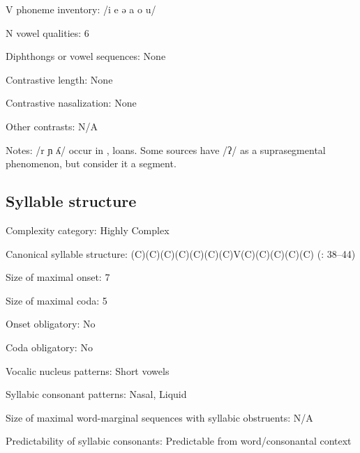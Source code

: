 {\begin{appendixdesc}
\item[V phoneme inventory:] /i e ə a o u/

\item[N vowel qualities:] 6

\item[Diphthongs or vowel sequences:] None

\item[Contrastive length:] None

\item[Contrastive nasalization:] None

\item[Other contrasts:] N/A

\item[Notes:] /r ɲ ʎ/ occur in ,  loans. Some sources have /ʔ/ as a suprasegmental phenomenon, but \citet{GeorgVolodin1999} consider it a segment. 
\end{appendixdesc}
\subsection*{Syllable structure}
\begin{appendixdesc}

\item[Complexity category:] Highly Complex

\item[Canonical syllable structure:] (C)(C)(C)(C)(C)(C)(C)V(C)(C)(C)(C)(C) (\citealt{GeorgVolodin1999}: 38--44)

\item[Size of maximal onset:] 7

\item[Size of maximal coda:] 5

\item[Onset obligatory:] No

\item[Coda obligatory:] No

\item[Vocalic nucleus patterns:] Short vowels

\item[Syllabic consonant patterns:] Nasal, Liquid

\item[Size of maximal word-marginal sequences with syllabic obstruents:] N/A

\item[Predictability of syllabic consonants:] Predictable from word/consonantal context


\end{appendixdesc}}
